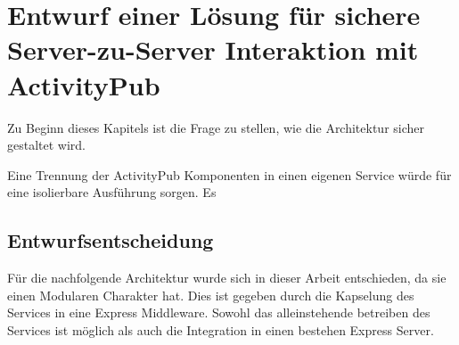 
\chapter{Entwurf einer Lösung für sichere Server-zu-Server Interaktion mit ActivityPub}
Zu Beginn dieses Kapitels ist die Frage zu stellen, wie die Architektur sicher gestaltet wird.

Eine Trennung der ActivityPub Komponenten in einen eigenen Service würde für eine isolierbare Ausführung sorgen. Es
\section{Entwurfsentscheidung}
Für die nachfolgende Architektur wurde sich in dieser Arbeit entschieden, da sie einen Modularen Charakter hat. Dies ist gegeben durch die Kapselung des Services in eine Express Middleware. Sowohl das alleinstehende betreiben des Services ist möglich als auch die Integration in einen bestehen Express Server.
